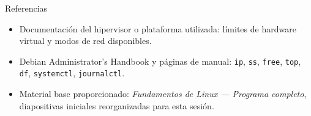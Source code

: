\documentclass[aspectratio=169,10pt,c]{beamer}
\begin{document}
\begin{frame}{Referencias}
\scriptsize
\begin{itemize}\setlength\itemsep{4pt}
  \item Documentación del hipervisor o plataforma utilizada: límites de hardware virtual y modos de red disponibles.
  \item Debian Administrator's Handbook y páginas de manual: \texttt{ip}, \texttt{ss}, \texttt{free}, \texttt{top}, \texttt{df}, \texttt{systemctl}, \texttt{journalctl}.
  \item Material base proporcionado: \emph{Fundamentos de Linux — Programa completo}, diapositivas iniciales reorganizadas para esta sesión.
\end{itemize}
\end{frame}
\end{document}
